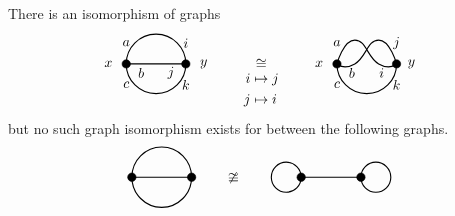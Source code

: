 \begin{example}
  There is an isomorphism of graphs
  \begin{equation*}
    \begin{tikzpicture}[scale = 1.5, baseline=-1mm]
      \draw[thick] (0, 0) node at (-.3, 0) {$x$} -- (1, 0) node at (1.3, 0) {$y$};
      \draw[thick] (0, 0) arc (180:0:.5);
      \draw[thick] (0, 0) arc (-180:0:.5);
      \draw[fill=black] (0, 0) circle (2pt);
      \draw[fill=black] (1, 0) circle (2pt);
      \node at (0, .35) {$a$};
      \node at (.25, -.15) {$b$};
      \node at (0, -.35) {$c$};
      \node at (1, .35) {$i$};
      \node at (0.75, -.15) {$j$};
      \node at (1, -.35) {$k$};
    \end{tikzpicture}
    \qquad \underset{
      \begin{aligned}
        i &\mapsto j \\ 
        j &\mapsto i
      \end{aligned}
      }{\cong} \qquad
    \begin{tikzpicture}[scale = 1.5, baseline=-1mm]
      \draw[thick] plot[smooth, tension=1] coordinates { (0, 0) (.3, 0) (.7, .4) (1, 0) };
      \draw[thick] plot[smooth, tension=1] coordinates { (0, 0) (.3, .4) (.7, 0) (1, 0) };
      \draw[thick] (0, 0) arc (-180:0:.5);
      \draw[fill=black] (0, 0) circle (2pt);
      \draw[fill=black] (1, 0) circle (2pt);
      \node at (-.3, 0) {$x$};
      \node at (1.25, 0) {$y$};
      \node at (0, .35) {$a$};
      \node at (.25, -.15) {$b$};
      \node at (0, -.35) {$c$};
      \node at (1, .35) {$j$};
      \node at (0.75, -.15) {$i$};
      \node at (1, -.35) {$k$};
    \end{tikzpicture}
  \end{equation*}
  but no such graph isomorphism exists for between the following graphs.
  \begin{equation*}
  \begin{tikzpicture}[scale = 1.5, baseline=-1mm]
    \draw[thick] (0, 0) -- (1, 0);
    \draw[thick] (0, 0) arc (180:0:.5);
    \draw[thick] (0, 0) arc (-180:0:.5);
    \draw[fill=black] (0, 0) circle (2pt);
    \draw[fill=black] (1, 0) circle (2pt);
  \end{tikzpicture}
  \qquad \ncong \qquad
  \begin{tikzpicture}[scale =1.5, baseline=-1mm]
    \draw[thick] (0, 0) -- (1, 0);
    \draw[thick] (-.25, 0) circle (2.5mm);
    \draw[thick] (1.25, 0) circle (2.5mm);
    \draw[fill=black] (0, 0) circle (2pt);
    \draw[fill=black] (1, 0) circle (2pt);
  \end{tikzpicture}
  \end{equation*}
\end{example}
